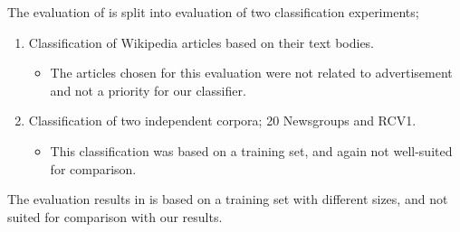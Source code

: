 The evaluation of \cite{schonhofen2009identifying} is split into evaluation of two classification experiments; 
\begin{enumerate}
\item Classification of Wikipedia articles based on their text bodies. 
\begin{itemize}
\item[] The articles chosen for this evaluation were not related to advertisement and  not a priority for our classifier. 
\end{itemize}
\item Classification of two independent corpora; 20 Newsgroups and RCV1. 
\begin{itemize}
\item[] This classification was based on a training set, and again not well-suited for comparison. 
\end{itemize}
\end{enumerate}

The evaluation results in \cite{kozlova2005automatic} is based on a training set with different sizes, and not suited for comparison with our results. 
